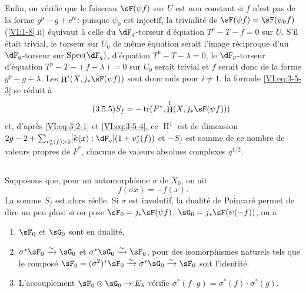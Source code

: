 \documentclass[oneside]{book}
\DeclareMathOperator{\h}{H}
\DeclareMathOperator{\spec}{Spec}
\DeclareMathOperator{\tr}{tr}
\newcommand{\iso}{\xrightarrow\sim}
\theoremstyle{sga-source}
\theoremstyle{sga-source-dash}
\theoremstyle{sga-source-dotdash}
\theoremstyle{sga-source-number-note-dash}
\theoremstyle{sga-source-note-number-dotdash}
\theoremstyle{sga-source-example-dotdash}
\theoremstyle{sga-source-inline-number}
\theoremstyle{sga-source-bare-number}
\theoremstyle{sga-source}
\newcommand{\PrintPage}[1]{}\newcommand{\MathPage}[1]{}\newcommand{\PrintCite}[2]{#1}\newcommand{\var}[3]{#1}
\begin{document}
Enfin, on vérifie que le faisceau $\sF(\psi f)$ sur $U$ est non constant si 
$f$ n'est pas de la forme $g^p-g+c^{t e}$: puisque $\psi_0$ est injectif, la 
trivialité de $\sF(\psi f)=\sF(\psi_0 f)$ (\ref{VI:1-8}.ii) équivaut à 
\var{celle du $\dF_q$-torseur}{celle du $\dF_p$-torseur}{S45-SOL-0771} d'équation $T^p-T-f=0$ sur $U$. S'il était trivial, 
le torseur sur $U_0$ de même équation \PrintPage{192}
serait l'image réciproque d'un 
\var{$\dF_q$-torseur sur $\spec(\dF_q)$}{$\dF_p$-torseur sur $\spec(\dF_q)$}{S45-SOL-0773}, d'équation $T^p-T-\lambda=0$, le 
$\dF_p$-torseur d'équation $T^p-T-(f-\lambda)=0$ sur $U_0$ serait trivial 
et $f$ serait donc de la forme $g^p-g+\lambda$. Les 
$\h^i(X,j_\ast \sF(\psi f))$ sont donc nuls pour $i\ne 1$, la formule 
\eqref{VI:eq:3-5-3} se réduit à 
\begin{equation*}\tag{3.5.5}\label{VI:eq:3-5-5}
  S_f = -\tr(F^\ast,\h^1(X,j_\ast \sF(\psi f))) 
\end{equation*}
et, d'après \eqref{VI:eq:3-2-1} et \eqref{VI:eq:3-5-4}, ce $\h^1$ est de 
dimension $2 g-2+\sum_{v_x^\ast(f)>0} [k(x):\dF_q](1+v_x^\ast(f))$ et $-S_f$ 
est somme de ce nombre de valeurs propres de $F^\ast$, chacune de valeurs 
absolues complexes $q^{1/2}$. 





\subsection{}\label{VI:3-6}

Supposons que, pour un automorphisme $\sigma$ de $X_0$, on ait 
\[
  f(\sigma x) = - f(x) \text{.} 
\]
La somme $S_f$ est alors réelle. Si $\sigma$ est involutif, la dualité de 
Poincaré permet de dire un peu plus: si on pose 
$\sF_0=j_\ast \sF(\psi f)$, $\sG_0 = j_\ast \sF(\psi(-f))$, on a 
\begin{enumerate}[\indent a)]
  \item $\sF_0$ et $\sG_0$ sont en dualité, 
  \item $\sigma^\ast \sF_0 \iso \sG_0$ et $\sigma^\ast \sG_0 \iso \sF_0$, pour 
    des isomorphismes naturels tels que le composé 
    $\sF_0=(\sigma^2)^\ast \sF_0 \iso \sigma^\ast \sG_0 \iso \sF_0$ soit 
    l'identité. 
  \item L'accouplement $\sF_0\otimes \sG_0 \to E_\lambda$ vérifie 
    $\sigma^\ast(f\cdot g) = \sigma^\ast(f) \cdot \sigma^\ast (g)$. 
\end{enumerate} 
\end{document}
